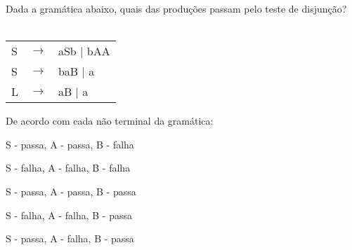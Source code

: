 \question[10]
Dada a gramática abaixo, quais das produções passam pelo teste de disjunção?\\
\\
\begin{tabular}{|l c l}
	S & $\rightarrow$ & aSb | bAA \\
    S & $\rightarrow$ & b{aB} | a \\
	L & $\rightarrow$ & aB | a \\
\end{tabular}

De acordo com cada não terminal da gramática:
\begin{choices}
\item S - passa, A - passa, B - falha %
\item S - falha, A - falha, B - falha
\item S - passa, A - passa, B - passa
\item S - falha, A - falha, B - passa
\item S - passa, A - falha, B - passa
\end{choices}
\answerline


